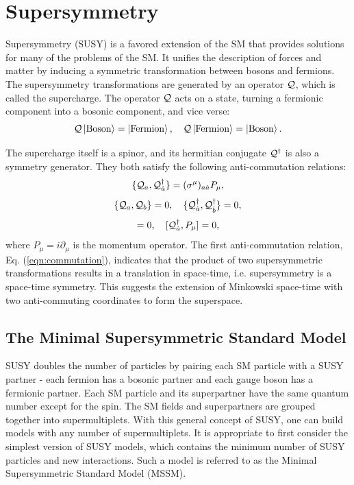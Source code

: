 \documentclass[thesis.tex]{subfiles}
\begin{document}
\section{Supersymmetry}

Supersymmetry (SUSY) is a favored extension of the SM that provides solutions for many of the problems of the SM. 
It unifies the description of forces and matter by inducing a symmetric transformation between bosons and fermions. 
The supersymmetry transformations are generated by an operator $\mathcal{Q}$, which is called the supercharge. 
The operator $\mathcal{Q}$ acts on a state, turning a fermionic component into a bosonic component, and vice verse: 
      \begin{equation}
        \mathcal{Q} \ket{ \text{Boson} } = \ket{ \text{Fermion}},   \quad   \mathcal{Q} \ket{\text{Fermion}} = \ket{ \text{Boson}}.
      \end{equation} 

The supercharge itself is a spinor, and its hermitian conjugate $\mathcal{Q}^\dagger$ is also a symmetry generator. 
They both satisfy the following anti-commutation relations:
    \begin{equation}
     \{\mathcal{Q}_a, \mathcal{Q}_{\dot{a}}^\dagger \} = (\sigma^\mu)_{a\dot{a}} P_\mu,
      \label{eqn:commutation}
     \end{equation} 
    \begin{equation}
     \{\mathcal{Q}_a, \mathcal{Q}_b \} = 0, \quad
     \{\mathcal{Q}_{\dot{a}}^\dagger, \mathcal{Q}_{\dot{b}}^\dagger \} = 0,
      \end{equation} 
      \begin{equation}
     [\OpQ_a, P_\mu] = 0, \quad  [\OpQ_{\dot{a}}^\dagger,  P_\mu] = 0,
    \end{equation} 
where $P_\mu = i\partial_\mu$ is the momentum operator. 
The first anti-commutation relation, Eq. (\ref{eqn:commutation}), indicates that the product of two supersymmetric transformations results in a translation in space-time, i.e. supersymmetry is a space-time symmetry. This suggests the extension of Minkowski space-time with two anti-commuting coordinates to form the superspace. 

\subsection{The Minimal Supersymmetric Standard Model }
SUSY doubles the number of particles by pairing each SM particle with a SUSY partner - each fermion has a bosonic partner and each gauge boson has a fermionic partner. 
Each SM particle and its superpartner have the same quantum number except for the spin. 
The SM fields and superpartners are grouped together into supermultiplets. 
With this general concept of SUSY, one can build models with any number of supermultiplets. 
It is appropriate to first consider the simplest version of SUSY models, which contains the minimum number of SUSY particles and new interactions. 
Such a model is referred to as the Minimal Supersymmetric Standard Model (MSSM). 
\end{document}
